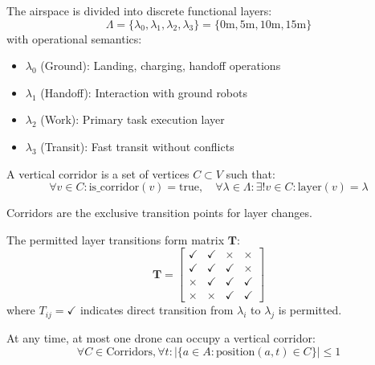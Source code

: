 \begin{definition}
The airspace is divided into discrete functional layers:
\begin{equation}
\Lambda = \{\lambda_0, \lambda_1, \lambda_2, \lambda_3\} = \{0\text{m}, 5\text{m}, 10\text{m}, 15\text{m}\}
\end{equation}
with operational semantics:
\begin{itemize}
    \item $\lambda_0$ (Ground): Landing, charging, handoff operations
    \item $\lambda_1$ (Handoff): Interaction with ground robots
    \item $\lambda_2$ (Work): Primary task execution layer
    \item $\lambda_3$ (Transit): Fast transit without conflicts
\end{itemize}
\end{definition}

\begin{definition}
A vertical corridor is a set of vertices $C \subset V$ such that:
\begin{equation}
\forall v \in C: \text{is\_corridor}(v) = \text{true}, \quad \forall \lambda \in \Lambda: \exists! v \in C: \text{layer}(v) = \lambda
\end{equation}
\end{definition}

Corridors are the exclusive transition points for layer changes.

\begin{definition}
The permitted layer transitions form matrix $\mathbf{T}$:
\begin{equation}
\mathbf{T} = \begin{bmatrix}
\checkmark & \checkmark & \times & \times \\
\checkmark & \checkmark & \checkmark & \times \\
\times & \checkmark & \checkmark & \checkmark \\
\times & \times & \checkmark & \checkmark
\end{bmatrix}
\end{equation}
where $T_{ij} = \checkmark$ indicates direct transition from $\lambda_i$ to $\lambda_j$ is permitted.
\end{definition}

\begin{axiom}
At any time, at most one drone can occupy a vertical corridor:
\begin{equation}
\forall C \in \text{Corridors}, \forall t: |\{a \in A : \text{position}(a, t) \in C\}| \leq 1
\end{equation}
\end{axiom}

